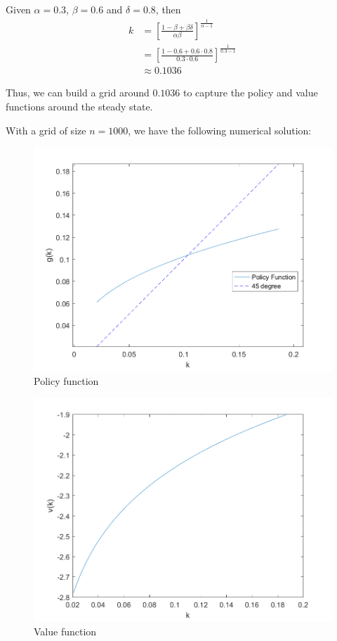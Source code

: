 \documentclass[12pt]{article}
\theoremstyle{definition}
\begin{document}
Given $\alpha = 0.3$, $\beta = 0.6$ and $\delta=0.8$, then 
\begin{align*}
k&=\left[ \frac{1-\beta +\beta \delta}{\alpha\beta }\right]^{\frac{1}{{\alpha-1}}} \\
&=\left[ \frac{1-0.6 +0.6 \cdot 0.8}{0.3\cdot 0.6}\right]^{\frac{1}{{0.3-1}}}\\
& \approx 0.1036
\end{align*}

Thus, we can build a grid around $0.1036$ to capture the policy and value functions around the steady state.

With a grid of size $n=1000$, we have the following numerical solution:
\begin{figure}[H]
	\centering
	\includegraphics[width=0.8\linewidth]{plot_policy}
	\caption{Policy function}
	\label{fig:plotpolicy}
\end{figure}
\begin{figure}[H]
	\centering
	\includegraphics[width=0.8\linewidth]{plot_value}
	\caption{Value function}
	\label{fig:plotvalue}
\end{figure}



\end{document}
